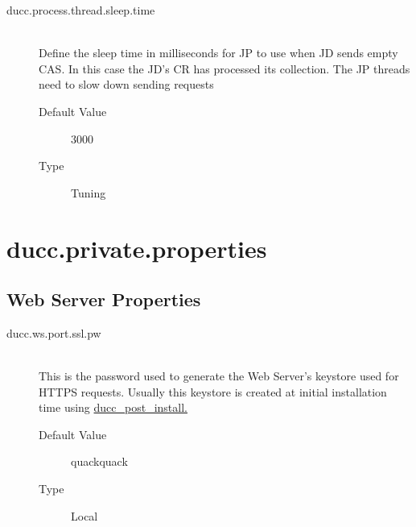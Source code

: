 \begin{description}
      \item[ducc.process.thread.sleep.time] \hfill \\
        Define the sleep time in milliseconds for JP to use when JD sends empty CAS. In this case the
        JD's CR has processed its collection. The JP threads need to slow down sending
        requests
        \begin{description}
          \item[Default Value] 3000
          \item[Type] Tuning
        \end{description}


      \end{description}
      

\section{ducc.private.properties}
\label{sec:ducc.private.properties}

\subsection{Web Server Properties}

    \begin{description}
    
        \item[ducc.ws.port.ssl.pw] \hfill \\
          This is the password used to generate the Web Server's keystore used for HTTPS requests.  Usually
          this keystore is created at initial installation time using \hyperref[subsec:install.single-user]{ducc\_post\_install.}
          \begin{description}
            \item[Default Value] quackquack 
            \item[Type] Local
          \end{description}
    \end{description}    
        
